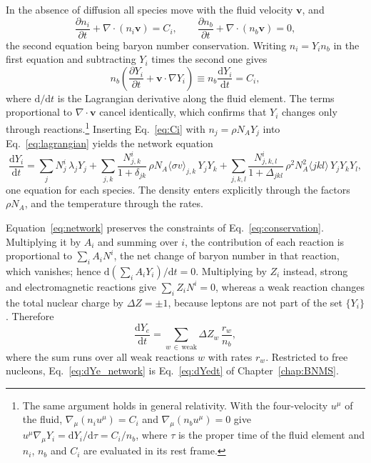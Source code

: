 In the absence of diffusion all species move with the fluid velocity $\mathbf{v}$, and
\begin{equation}\label{eq:species_cont}
  \frac{\partial n_i}{\partial t}+\nabla\cdot(n_i\mathbf{v})=C_i,\qquad \frac{\partial n_b}{\partial t}+\nabla\cdot(n_b\mathbf{v})=0 ,
\end{equation}
the second equation being baryon number conservation.
Writing $n_i=Y_in_b$ in the first equation and subtracting $Y_i$ times the second one gives
\begin{equation}\label{eq:lagrangian}
  n_b\left(\frac{\partial Y_i}{\partial t}+\mathbf{v}\cdot\nabla Y_i\right)\equiv n_b\frac{\mathrm{d}Y_i}{\mathrm{d}t}=C_i ,
\end{equation}
where $\mathrm{d}/\mathrm{d}t$ is the Lagrangian derivative along the fluid element.
The terms proportional to $\nabla\cdot\mathbf{v}$ cancel identically, which confirms that $Y_i$ changes only through reactions.\footnote{The same argument holds in general relativity. With the four-velocity $u^\mu$ of the fluid, $\nabla_\mu(n_iu^\mu)=C_i$ and $\nabla_\mu(n_bu^\mu)=0$ give $u^\mu\nabla_\mu Y_i=\mathrm{d}Y_i/\mathrm{d}\tau=C_i/n_b$, where $\tau$ is the proper time of the fluid element and $n_i$, $n_b$ and $C_i$ are evaluated in its rest frame.}
Inserting Eq.~\ref{eq:Ci} with $n_j=\rho N_AY_j$ into Eq.~\ref{eq:lagrangian} yields the network equation~\cite{reichert_nuclear_2023}
\begin{equation}\label{eq:network}
  \frac{\mathrm{d}Y_i}{\mathrm{d}t}=\sum_jN^i_j\,\lambda_jY_j+\sum_{j,k}\frac{N^i_{j,k}}{1+\delta_{jk}}\,\rho N_A\langle\sigma v\rangle_{j,k}\,Y_jY_k+\sum_{j,k,l}\frac{N^i_{j,k,l}}{1+\Delta_{jkl}}\,\rho^2N_A^2\langle jkl\rangle\,Y_jY_kY_l ,
\end{equation}
one equation for each species.
The density enters explicitly through the factors $\rho N_A$, and the temperature through the rates.

Equation~\ref{eq:network} preserves the constraints of Eq.~\ref{eq:conservation}.
Multiplying it by $A_i$ and summing over $i$, the contribution of each reaction is proportional to $\sum_iA_iN^i$, the net change of baryon number in that reaction, which vanishes; hence $\mathrm{d}(\sum_iA_iY_i)/\mathrm{d}t=0$.
Multiplying by $Z_i$ instead, strong and electromagnetic reactions give $\sum_iZ_iN^i=0$, whereas a weak reaction changes the total nuclear charge by $\Delta Z=\pm1$, because leptons are not part of the set $\{Y_i\}$.
Therefore
\begin{equation}\label{eq:dYe_network}
  \frac{\mathrm{d}Y_e}{\mathrm{d}t}=\sum_{w\,\in\,\text{weak}}\Delta Z_w\,\frac{r_w}{n_b},
\end{equation}
where the sum runs over all weak reactions $w$ with rates $r_w$.
Restricted to free nucleons, Eq.~\ref{eq:dYe_network} is Eq.~\ref{eq:dYedt} of Chapter~\ref{chap:BNMS}.

